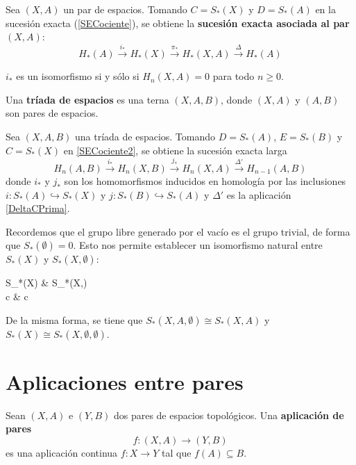 \begin{definition}
Sea $(X,A)$ un par de espacios. Tomando $C=S_*(X)$ y $D=S_*(A)$ en la
sucesión exacta (\ref{SECociente}), se obtiene la \textbf{sucesión exacta
asociada al par $(X,A)$}:
\[H_*(A) \xrightarrow{i_*} H_*(X) \xrightarrow{\pi_*} H_*(X,A)
\xrightarrow{\Delta} H_*(A)\]
\end{definition}

\begin{proposition}
$i_*$ es un isomorfismo si y sólo si $H_n(X,A)=0$ para todo $n \geq 0$.
\end{proposition}

Una \textbf{tríada de espacios} es una terna $(X,A,B)$, donde $(X,A)$ y
$(A,B)$ son pares de espacios.

Sea $(X,A,B)$ una tríada de espacios. Tomando $D=S_*(A)$, $E=S_*(B)$ y
$C=S_*(X)$ en \eqref{SECociente2}, se obtiene la sucesión exacta larga
\[H_n(A,B) \xrightarrow{i_*} H_n(X,B) \xrightarrow{j_*} H_n(X,A)
\xrightarrow{\Delta'} H_{n-1}(A,B)\]
donde $i_*$ y $j_*$ son los homomorfismos inducidos en homología por las
inclusiones $i\colon S_*(A) \hookrightarrow S_*(X)$ y $j\colon S_*(B)
\hookrightarrow S_*(A)$ y $\Delta'$ es la aplicación \eqref{DeltaCPrima}.

Recordemos que el grupo libre generado por el vacío es el grupo trivial, de
forma que $S_*(\emptyset)=0$. Esto nos permite establecer un isomorfismo
natural entre $S_*(X)$ y $S_*(X,\emptyset)$:
\begin{funcion}
S_*(X) \arrow[r] & S_*(X,\emptyset)\\
c \arrow[r, maps to] & \overline c
\end{funcion}
De la misma forma, se tiene que $S_*(X,A,\emptyset) \cong S_*(X,A)$ y
$S_*(X)\cong S_*(X,\emptyset,\emptyset)$.

\section{Aplicaciones entre pares}
\begin{definition}
Sean $(X,A)$ e $(Y,B)$ dos pares de espacios topológicos. Una
\textbf{aplicación de pares}
\[f\colon (X,A) \longrightarrow (Y,B)\]
es una aplicación continua $f\colon X \longrightarrow Y$ tal que $f(A)
\subseteq B$.
\end{definition}

